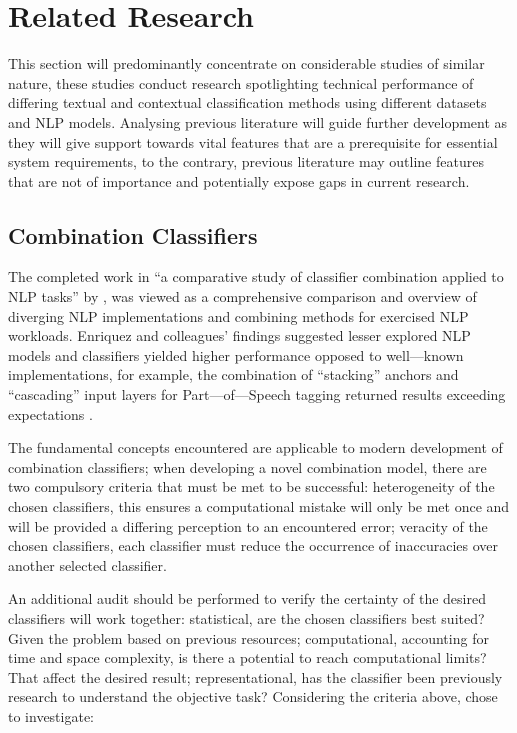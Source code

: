 \section{Related Research}

This section will predominantly concentrate on considerable studies of similar nature, these studies conduct research spotlighting technical performance of differing textual and contextual classification methods using different datasets and NLP models. Analysing previous literature will guide further development as they will give support towards vital features that are a prerequisite for essential system requirements, to the contrary, previous literature may outline features that are not of importance and potentially expose gaps in current research.

\subsection{Combination Classifiers}

The completed work in “a comparative study of classifier combination applied to NLP tasks” by \textcite{enriquez2013comparative}, was viewed as a comprehensive comparison and overview of diverging NLP implementations and combining methods for exercised NLP workloads. Enriquez and colleagues’ findings suggested lesser explored NLP models and classifiers yielded higher performance opposed to well---known implementations, for example, the combination of “stacking” anchors and “cascading” input layers for Part---of---Speech tagging returned results exceeding expectations \parencite{enriquez2013comparative}.

The fundamental concepts \textcite{enriquez2013comparative} encountered are applicable to modern development of combination classifiers; when developing a novel combination model, there are two compulsory criteria that must be met to be successful: heterogeneity of the chosen classifiers, this ensures a computational mistake will only be met once and will be provided a differing perception to an encountered error; veracity of the chosen classifiers, each classifier must reduce the occurrence of inaccuracies over another selected classifier.

An additional audit should be performed to verify the certainty of the desired classifiers will work together: statistical, are the chosen classifiers best suited? Given the problem based on previous resources; computational, accounting for time and space complexity, is there a potential to reach computational limits? That affect the desired result; representational, has the classifier been previously research to understand the objective task? Considering the criteria above, \textcite{enriquez2013comparative} chose to investigate:


